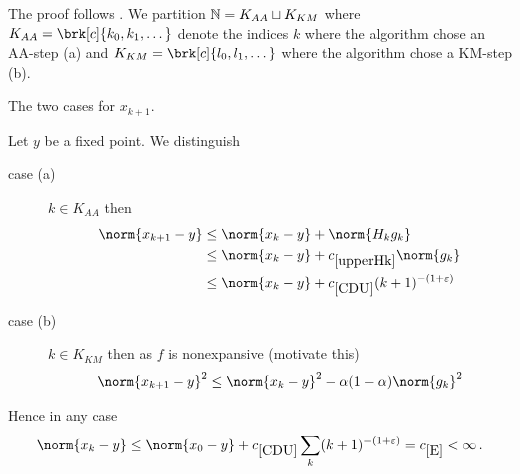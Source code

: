 \begin{frame}
	\begin{proofs}
	\vspace*{1cm}
	\centering
	\scalebox{0.9}{
	
	}
	\end{proofs}
\end{frame}

\begin{frame}
	\begin{proofs}
	The proof follows \cite[Theorem 6]{ZhaAA}.
	We partition $\mathbb{N}=K_{AA}\sqcup K_{KM}$ where $K_{AA}=\brk[c]{k_0,k_1,\dots}$ denote the indices $k$ where the algorithm chose an AA-step (a) and $K_{KM}=\brk[c]{l_0,l_1,\dots}$ where the algorithm chose a KM-step (b).
	
	\begin{center}
	\begin{algorithm}[H]
	\caption{The two cases for $x_{k+1}$.}
	\end{algorithm}
	\end{center}
	\end{proofs}
\end{frame}


\begin{frame}
	\begin{proofs}
	Let $y$ be a fixed point. We distinguish
	\begin{description}
		\item[case (a)]
		$k\in K_{AA}$ then
		\begin{equation}
		\begin{aligned}
			\norm{x_{k+1}-y}&\leq \norm{x_k-y}+\norm{H_kg_k} \\
			&\leq \norm{x_k-y}+\useconstant{upperHk}\norm{g_k} \\
			&\leq \norm{x_k-y}+\useconstant{CDU}(k+1)^{-(1+\e)}
			\label{eq:16}
		\end{aligned}
		\end{equation}
		\item[case (b)]
		$k\in K_{KM}$ then as $f$ is nonexpansive (motivate this)
		\begin{align}
			\norm{x_{k+1}-y}^2\leq \norm{x_k-y}^2-\alpha(1-\alpha)\norm{g_k}^2
			\label{eq:17}
		\end{align}
	\end{description}
	Hence in any case
	\begin{align*}
		\norm{x_k-y}
		\leq \norm{x_0-y}+\useconstant{CDU}\sum_k(k+1)^{-(1+\e)}
		= \useconstant{E}<\infty\,.
	\end{align*}
	\end{proofs}
\end{frame}


